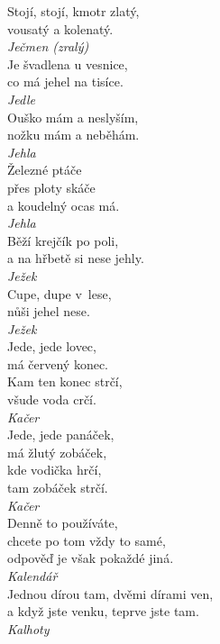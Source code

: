 \begin{multicols}{3}
\noindent
Stojí, stojí, kmotr zlatý,\\
vousatý a kolenatý.\\[1 mm]
{\sl Ječmen (zralý)}\\

\noindent
Je švadlena u vesnice,\\
co má jehel na tisíce.\\[1 mm]
{\sl Jedle}\\

\noindent
Ouško mám a neslyším,\\
nožku mám a neběhám.\\[1 mm]
{\sl Jehla}\\

\noindent
Železné ptáče\\
přes ploty skáče\\
a koudelný ocas má.\\[1 mm]
{\sl Jehla}\\

\noindent
Běží krejčík po poli,\\
a na hřbetě si nese jehly.\\[1 mm]
{\sl Ježek}\\

\noindent
Cupe, dupe v~lese,\\
nůši jehel nese.\\[1 mm]
{\sl Ježek}\\

\noindent
Jede, jede lovec,\\
má červený konec.\\
Kam ten konec strčí,\\
všude voda crčí.\\[1 mm]
{\sl Kačer}\\

\noindent
Jede, jede panáček,\\
má žlutý zobáček,\\
kde vodička hrčí,\\
tam zobáček strčí.\\[1 mm]
{\sl Kačer}\\

\noindent
Denně to používáte,\\
chcete po tom vždy to samé,\\
odpověď je však pokaždé jiná.\\[1 mm]
{\sl Kalendář}\\

\noindent
Jednou dírou tam, dvěmi dírami ven,\\
a když jste venku, teprve jste tam.\\[1 mm]
{\sl Kalhoty}\\


\end{multicols}
